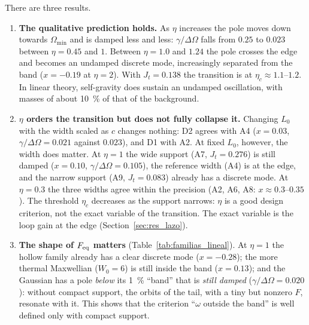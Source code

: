\documentclass[11pt,a4paper]{article}
\begin{document}
There are three results.
\begin{enumerate}
\item \textbf{The qualitative prediction holds.} As $\eta$ increases the pole moves down
towards $\Omega_{\min}$ and is damped less and less: $\gamma/\Delta\Omega$ falls from $0.25$ to $0.023$
between $\eta=0.45$ and $1$. Between $\eta=1.0$ and $1.24$ the pole crosses the edge and becomes
an undamped discrete mode, increasingly separated from the band ($x=-0.19$ at $\eta=2$). With
$J_t=0.138$ the transition is at $\eta_c\approx1.1$--$1.2$. In linear theory, self-gravity does
sustain an undamped oscillation, with masses of about \SI{10}{\%} of that of the background.
\item \textbf{$\eta$ orders the transition but does not fully collapse it.} Changing $L_0$ with
the width scaled as $c$ changes nothing: D2 agrees with A4 ($x=0.03$, $\gamma/\Delta\Omega=0.021$
against $0.023$), and D1 with A2. At fixed $L_0$, however, the width does matter. At $\eta=1$
the wide support (A7, $J_t=0.276$) is still damped ($x=0.10$, $\gamma/\Delta\Omega=0.105$), the
reference width (A4) is at the edge, and the narrow support (A9, $J_t=0.083$) already has a
discrete mode. At $\eta=0.3$ the three widths agree within the precision (A2, A6, A8:
$x\approx0.3$--$0.35$). The threshold $\eta_c$ decreases as the support narrows: $\eta$ is a good
design criterion, not the exact variable of the transition. The exact variable is the loop
gain at the edge (Section~\ref{sec:res_lazo}).
\item \textbf{The shape of $F_{\rm eq}$ matters} (Table~\ref{tab:familias_lineal}). At $\eta=1$ the
hollow family already has a clear discrete mode ($x=-0.28$); the more thermal Maxwellian
($W_0=6$) is still inside the band ($x=0.13$); and the Gaussian has a pole \emph{below} its
\SI{1}{\%} ``band'' that is \emph{still damped} ($\gamma/\Delta\Omega=0.020$): without compact support,
the orbits of the tail, with a tiny but nonzero $F$, resonate with it. This shows that the
criterion ``$\omega$ outside the band'' is well defined only with compact support.
\end{enumerate}
\end{document}
